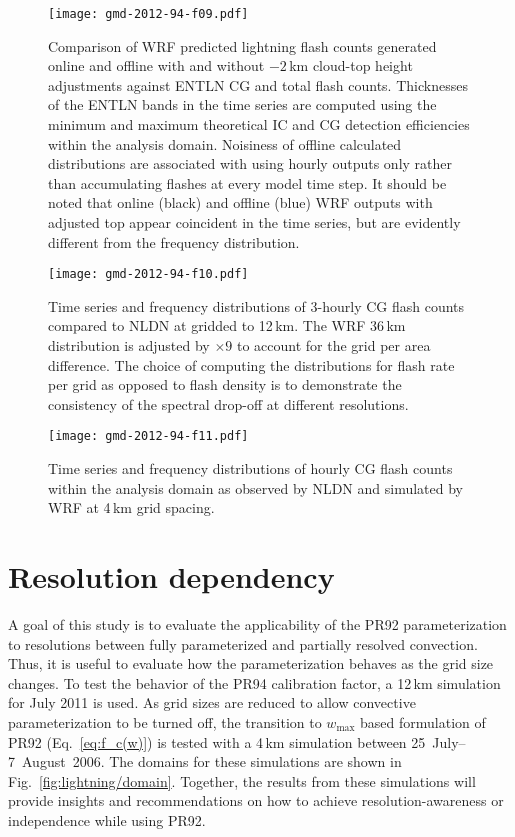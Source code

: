 \begin{figure*}[t]
\texttt{[image: gmd-2012-94-f09.pdf]}
\caption[ENTLN and predicted total lightning]{Comparison of WRF predicted lightning flash counts generated online
and offline with and without $-2$\,\unit{km} cloud-top height adjustments
against ENTLN CG and total flash counts. Thicknesses of the ENTLN bands in
the time series are computed using the minimum and maximum theoretical IC and
CG detection efficiencies within the analysis domain. Noisiness of offline
calculated distributions are associated with using hourly outputs only rather
than accumulating flashes at every model time step. It should be noted that
online (black) and offline (blue) WRF outputs with adjusted top appear
coincident in the time series, but are evidently different from the frequency
distribution.}
      \label{fig:lightning/offcompare}
\end{figure*}

\begin{figure}[t]
      \texttt{[image: gmd-2012-94-f10.pdf]}
      \caption[Resolution-dependency of lightning prediction]
	{Time series and frequency distributions of 3-hourly CG flash counts compared to NLDN at gridded to 12\,\unit{km}.
      The WRF 36\,\unit{km} distribution is adjusted by $\times9$ to account for the grid per area difference. The choice of
      computing the distributions for flash rate per grid as opposed to flash density is to demonstrate the consistency of
      the spectral drop-off at different resolutions.}
      \label{fig:lightning/gabiseries}
\end{figure}

\begin{figure}[t]
      \texttt{[image: gmd-2012-94-f11.pdf]}
      \caption[Formulation dependency of lightning prediction]
	{Time series and frequency distributions of hourly CG flash counts within
      the analysis domain as observed by NLDN and simulated by WRF at 4\,\unit{km} grid spacing.}
      \label{fig:lightning/4kmseries}
\end{figure}

\section{Resolution dependency}\label{sec:lightning/resolution}

A goal of this study is to evaluate the applicability of the PR92
parameterization to resolutions between fully parameterized and partially
resolved convection. Thus, it is useful to evaluate how the parameterization
behaves as the grid size changes. To test the behavior of the PR94
calibration factor, a 12\,\unit{km} simulation for July 2011 is used. As grid
sizes are reduced to allow convective parameterization to be turned off, the
transition to $w_{\max}$ based formulation of PR92 (Eq.~\ref{eq:f_c(w)}) is
tested with a 4\,\unit{km} simulation between 25~July--7~August~2006. The
domains for these simulations are shown in Fig.~\ref{fig:lightning/domain}. Together,
the results from these simulations will provide insights and recommendations
on how to achieve resolution-awareness or independence while using PR92.

